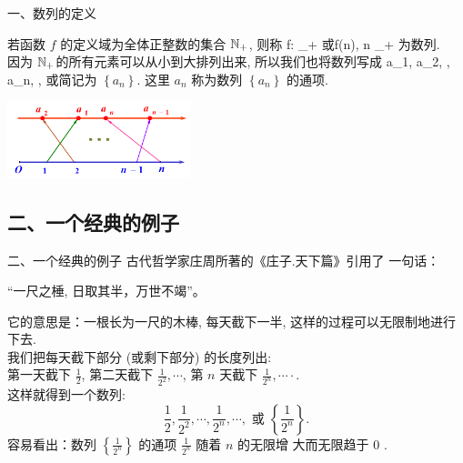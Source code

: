 \documentclass[mathserif]{beamer}
\begin{document}
\begin{frame}{一、数列的定义}
	
	\suojin 若函数 $f$ 的定义域为全体正整数的集合 $\mathbb{N}_{+}$, 则称
	\benas
	f: \N_{+} \rightarrow \R$ 或 $f(n), n \in \N_{+}
	\eenas
	为数列. \\
	\suojin 因为 $\mathbb{N}_{+}$的所有元素可以从小到大排列出来, 所以我们也将数列写成
	\benas
	a_1, a_2, \cdots, a_n, \cdots,
	\eenas
	或简记为 $\left\{a_n\right\}$. 这里 $a_n$ 称为数列 $\left\{a_n\right\}$ 的通项.
	\begin{center}
		\includegraphics[width=0.4\textwidth]{figures/shuliedingyi1.png}
		\vspace{-0.85\baselineskip}
	\end{center}
	
\end{frame}

\subsection{二、一个经典的例子}

\begin{frame}{二、一个经典的例子}
	\suojin 古代哲学家庄周所著的《庄子.天下篇》引用了 一句话：
	\begin{center}“一尺之棰, 日取其半，万世不竭”。
	\end{center}
    它的意思是：一根长为一尺的木棒, 每天截下一半, 这样的过程可以无限制地进行下去.\\
	\suojin 我们把每天截下部分 (或剩下部分) 的长度列出:\\ 第一天截下 $\frac{1}{2}$, 第二天截下 $\frac{1}{2^2}, \cdots$, 第 $n$ 天截下 $\frac{1}{2^n}, \cdots \cdot.$\\ 
	\suojin 这样就得到一个数列:
	$$
	\frac{1}{2}, \frac{1}{2^2}, \cdots, \frac{1}{2^n}, \cdots, \text { 或 }\left\{\frac{1}{2^n}\right\} .
	$$
	容易看出：数列 $\left\{\frac{1}{2^n}\right\}$ 的通项 $\frac{1}{2^n}$ 随着 $n$ 的无限增 大而无限趋于 $0$ .
	
\end{frame}


\end{document}
